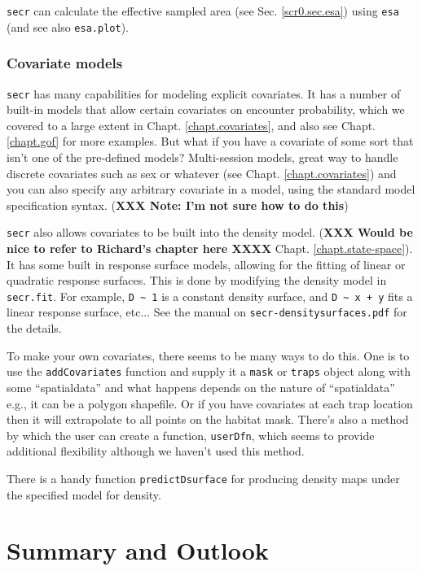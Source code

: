 \mbox{\tt secr} can calculate the effective sampled area (see Sec. \ref{scr0.sec.esa}) using
\mbox{\tt esa} (and see also \mbox{\tt esa.plot}). 

\subsubsection{Covariate models}
\mbox{\tt secr} has many capabilities for modeling explicit
covariates. It has a number of built-in models that allow certain
covariates on encounter probability, which we covered to a large
extent in
 Chapt. \ref{chapt.covariates}, and also see
Chapt. \ref{chapt.gof} for more examples. But what if you have a
covariate of some sort that isn't one of the pre-defined models?
Multi-session models, great way to handle discrete covariates such as
sex or whatever (see Chapt. \ref{chapt.covariates}) and you can also
specify any arbitrary covariate in a model, using the standard model
specification syntax.
({\bf XXX Note: I'm not sure how to do this})

\mbox{\tt secr} also allows covariates to be built into the density
model. ({\bf XXX Would be nice to refer to Richard's chapter here
  XXXX}
 Chapt. \ref{chapt.state-space}).
It has some built in response surface models, allowing for the fitting
of linear or quadratic response surfaces. This is done by
modifying the density model in \mbox{\tt secr.fit}. For example, \verb+D ~ 1+ is a
constant density surface, and \verb#D ~ x + y# fits a linear response
surface, etc...  See the manual on \mbox{\tt secr-densitysurfaces.pdf}
for the details.

To make your own covariates, there seems to be many ways to do
this. One is to use the \mbox{\tt addCovariates} function and supply
it a \mbox{\tt mask} or
\mbox{\tt traps} object along with some ``spatialdata'' and what happens depends
on the nature of ``spatialdata'' e.g., it can be a polygon
shapefile. Or if you have covariates at each trap location then it
will extrapolate to all points on the habitat mask.  There's also a
method by which the user can create a function, \mbox{\tt userDfn},
which seems to provide additional flexibility although we haven't used
this method. 

There is a handy function 
\mbox{\tt predictDsurface} for producing density maps under the
specified model for density. 




\section{Summary and Outlook}

